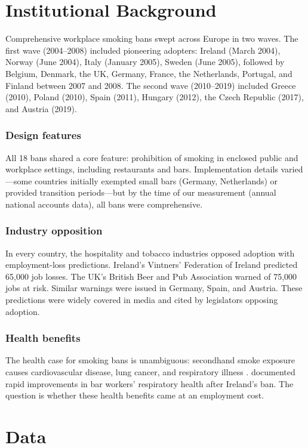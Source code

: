 \documentclass[12pt]{article}
\begin{document}
\section{Institutional Background}

Comprehensive workplace smoking bans swept across Europe in two waves. The first wave (2004--2008) included pioneering adopters: Ireland (March 2004), Norway (June 2004), Italy (January 2005), Sweden (June 2005), followed by Belgium, Denmark, the UK, Germany, France, the Netherlands, Portugal, and Finland between 2007 and 2008. The second wave (2010--2019) included Greece (2010), Poland (2010), Spain (2011), Hungary (2012), the Czech Republic (2017), and Austria (2019).

\subsubsection*{Design features} All 18 bans shared a core feature: prohibition of smoking in enclosed public and workplace settings, including restaurants and bars. Implementation details varied---some countries initially exempted small bars (Germany, Netherlands) or provided transition periods---but by the time of our measurement (annual national accounts data), all bans were comprehensive.

\subsubsection*{Industry opposition} In every country, the hospitality and tobacco industries opposed adoption with employment-loss predictions. Ireland's Vintners' Federation of Ireland predicted 65,000 job losses. The UK's British Beer and Pub Association warned of 75,000 jobs at risk. Similar warnings were issued in Germany, Spain, and Austria. These predictions were widely covered in media and cited by legislators opposing adoption.

\subsubsection*{Health benefits} The health case for smoking bans is unambiguous: secondhand smoke exposure causes cardiovascular disease, lung cancer, and respiratory illness \citep{fichtenberg2000, who2019}. \citet{mullally2009} documented rapid improvements in bar workers' respiratory health after Ireland's ban. The question is whether these health benefits came at an employment cost.


\section{Data}
\end{document}
